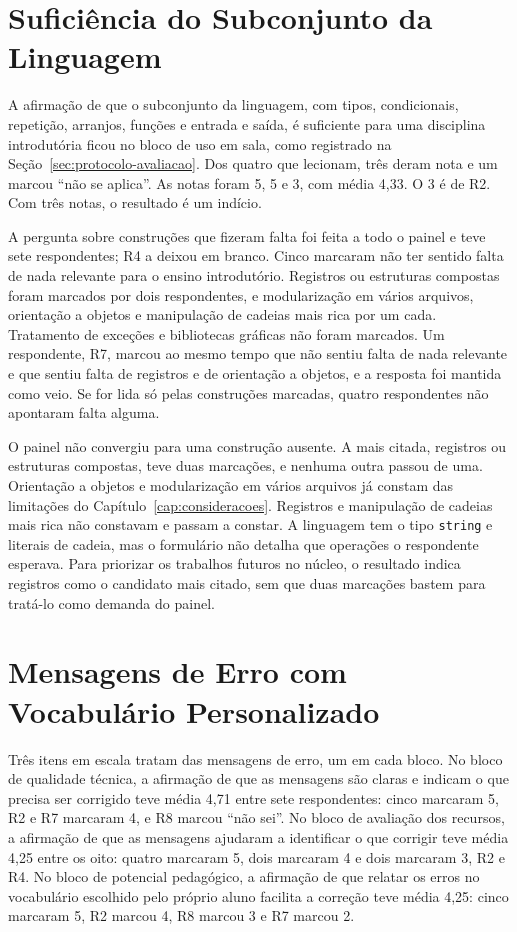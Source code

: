 \section{Suficiência do Subconjunto da Linguagem}
\label{sec:resultado-subconjunto}

A afirmação de que o subconjunto da linguagem, com tipos, condicionais, repetição, arranjos, funções e entrada e saída, é suficiente para uma disciplina introdutória ficou no bloco de uso em sala, como registrado na Seção~\ref{sec:protocolo-avaliacao}. Dos quatro que lecionam, três deram nota e um marcou ``não se aplica''. As notas foram 5, 5 e 3, com média 4,33. O 3 é de R2. Com três notas, o resultado é um indício.

A pergunta sobre construções que fizeram falta foi feita a todo o painel e teve sete respondentes; R4 a deixou em branco. Cinco marcaram não ter sentido falta de nada relevante para o ensino introdutório. Registros ou estruturas compostas foram marcados por dois respondentes, e modularização em vários arquivos, orientação a objetos e manipulação de cadeias mais rica por um cada. Tratamento de exceções e bibliotecas gráficas não foram marcados. Um respondente, R7, marcou ao mesmo tempo que não sentiu falta de nada relevante e que sentiu falta de registros e de orientação a objetos, e a resposta foi mantida como veio. Se for lida só pelas construções marcadas, quatro respondentes não apontaram falta alguma.

O painel não convergiu para uma construção ausente. A mais citada, registros ou estruturas compostas, teve duas marcações, e nenhuma outra passou de uma. Orientação a objetos e modularização em vários arquivos já constam das limitações do Capítulo~\ref{cap:consideracoes}. Registros e manipulação de cadeias mais rica não constavam e passam a constar. A linguagem tem o tipo \texttt{string} e literais de cadeia, mas o formulário não detalha que operações o respondente esperava. Para priorizar os trabalhos futuros no núcleo, o resultado indica registros como o candidato mais citado, sem que duas marcações bastem para tratá-lo como demanda do painel.

\section{Mensagens de Erro com Vocabulário Personalizado}
\label{sec:resultado-diagnosticos}

Três itens em escala tratam das mensagens de erro, um em cada bloco. No bloco de qualidade técnica, a afirmação de que as mensagens são claras e indicam o que precisa ser corrigido teve média 4,71 entre sete respondentes: cinco marcaram 5, R2 e R7 marcaram 4, e R8 marcou ``não sei''. No bloco de avaliação dos recursos, a afirmação de que as mensagens ajudaram a identificar o que corrigir teve média 4,25 entre os oito: quatro marcaram 5, dois marcaram 4 e dois marcaram 3, R2 e R4. No bloco de potencial pedagógico, a afirmação de que relatar os erros no vocabulário escolhido pelo próprio aluno facilita a correção teve média 4,25: cinco marcaram 5, R2 marcou 4, R8 marcou 3 e R7 marcou 2.


